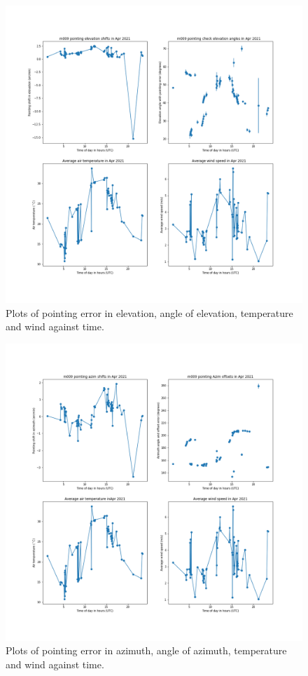 \documentclass{article}
\begin{document}
\begin{figure}[H]
	\centering
	\includegraphics[scale=0.45]{m009_elev_Apr_mapped.png}
	
	\caption{Plots of pointing error in elevation, angle of elevation, temperature and wind against time.}
	\label{fig:m009ElevAprMapped}
\end{figure}

\begin{figure}[H]
	\centering
	\includegraphics[scale=0.45]{m009_azim_Apr_mapped.png}
	
	\caption{Plots of pointing error in azimuth, angle of azimuth, temperature and wind against time.}
	\label{fig:m009AzimAprMapped}
\end{figure}
\end{document}
